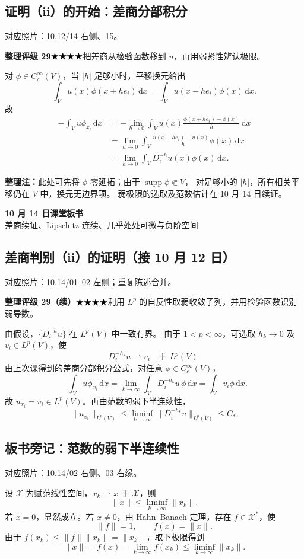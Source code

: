 \documentclass[UTF8,a4paper,11pt,fontset=fandol]{ctexart}
\newcommand{\dd}{\,\mathrm d}
\newcommand{\ednote}[1]{\par{\small\color{notegray}\textbf{整理注：}#1}\par}
\newcommand{\source}[1]{{\small\color{notegray}对应照片：#1。}\par}
\newcommand{\proofstars}[1]{\ensuremath{%
\ifnum#1>0\relax\bigstar\fi
\ifnum#1>1\relax\bigstar\fi
\ifnum#1>2\relax\bigstar\fi
\ifnum#1>3\relax\bigstar\fi
\ifnum#1>4\relax\bigstar\fi}}
\newcommand{\proofrating}[3]{\par{\small\color{proofblue}%
\textbf{整理评级 #1}\enspace\proofstars{#2}\quad #3\par}}
\begin{document}
\newpage
\subsection*{证明（ii）的开始：差商分部积分}
\source{10.12/14 右侧、15}
\proofrating{29}{4}{把差商从检验函数移到 $u$，再用弱紧性辨认极限。}
对 $\phi\in C_c^\infty(V)$，当 $|h|$ 足够小时，平移换元给出
\[
\int_Vu(x)\phi(x+he_i)\dd x
=\int_Vu(x-he_i)\phi(x)\dd x.
\]
故
\[
\begin{aligned}
-\int_Vu\phi_{x_i}\dd x
&=-\lim_{h\to0}\int_Vu(x)\frac{\phi(x+he_i)-\phi(x)}h\dd x\\
&=\lim_{h\to0}\int_V\frac{u(x-he_i)-u(x)}{-h}\phi(x)\dd x\\
&=\lim_{h\to0}\int_VD_i^{-h}u(x)\phi(x)\dd x.
\end{aligned}
\]
\ednote{此处可先将 $\phi$ 零延拓；由于 $\operatorname{supp}\phi\Subset V$，
对足够小的 $|h|$，所有相关平移仍在 $V$ 中，换元无边界项。
弱极限的选取及范数估计在 10 月 14 日续证。}

\newpage
{}
\begin{center}
{\LARGE\bfseries 10 月 14 日课堂板书}\\[5pt]
{差商续证、Lipschitz 连续、几乎处处可微与负阶空间}
\end{center}

\subsection*{差商判别（ii）的证明（接 10 月 12 日）}
\source{10.14/01--02 左侧；重复陈述合并}
\proofrating{29（续）}{4}{利用 $L^p$ 的自反性取弱收敛子列，并用检验函数识别弱导数。}
由假设，$\{D_i^{-h}u\}$ 在 $L^p(V)$ 中一致有界。
由于 $1<p<\infty$，可选取 $h_k\to0$ 及 $v_i\in L^p(V)$，使
\[
D_i^{-h_k}u\rightharpoonup v_i\quad\text{于 }L^p(V).
\]
由上次课得到的差商分部积分公式，对任意 $\phi\in C_c^\infty(V)$，
\[
-\int_Vu\phi_{x_i}\dd x
=\lim_{k\to\infty}\int_VD_i^{-h_k}u\,\phi\dd x
=\int_Vv_i\phi\dd x.
\]
故 $u_{x_i}=v_i\in L^p(V)$。再由范数的弱下半连续性，
\[
\|u_{x_i}\|_{L^p(V)}
\leq\liminf_{k\to\infty}\|D_i^{-h_k}u\|_{L^p(V)}\leq C_*.
\]

\subsection*{板书旁记：范数的弱下半连续性}
\source{10.14/02 右侧、03 右缘}
设 $\mathcal X$ 为赋范线性空间，$x_k\rightharpoonup x$ 于 $\mathcal X$，则
\[
\boxed{\|x\|\leq\liminf_{k\to\infty}\|x_k\|.}
\]
若 $x=0$，显然成立。若 $x\ne0$，由 Hahn--Banach 定理，存在
$f\in\mathcal X^*$，使
\[
\|f\|=1,\qquad f(x)=\|x\|.
\]
由于 $f(x_k)\leq\|f\|\|x_k\|=\|x_k\|$，取下极限得到
\[
\|x\|=f(x)=\lim_{k\to\infty}f(x_k)
\leq\liminf_{k\to\infty}\|x_k\|.
\]
\end{document}
